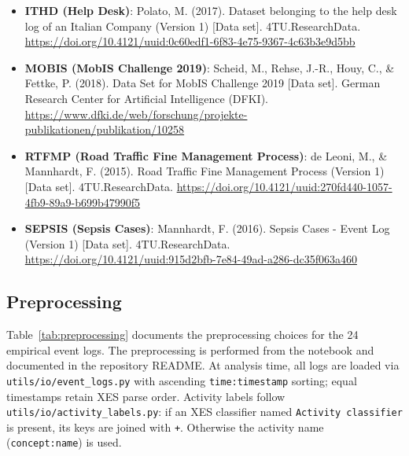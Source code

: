 \documentclass[11pt,a4paper]{article}
\begin{document}
\begin{itemize}
\item \textbf{ITHD (Help Desk)}: Polato, M. (2017). Dataset belonging to the help desk log of an Italian Company (Version 1) [Data set]. 4TU.ResearchData. \url{https://doi.org/10.4121/uuid:0c60edf1-6f83-4e75-9367-4c63b3e9d5bb}
\item \textbf{MOBIS (MobIS Challenge 2019)}: Scheid, M., Rehse, J.-R., Houy, C., \& Fettke, P. (2018). Data Set for MobIS Challenge 2019 [Data set]. German Research Center for Artificial Intelligence (DFKI). \url{https://www.dfki.de/web/forschung/projekte-publikationen/publikation/10258}
\item \textbf{RTFMP (Road Traffic Fine Management Process)}: de Leoni, M., \& Mannhardt, F. (2015). Road Traffic Fine Management Process (Version 1) [Data set]. 4TU.ResearchData. \url{https://doi.org/10.4121/uuid:270fd440-1057-4fb9-89a9-b699b47990f5}
\item \textbf{SEPSIS (Sepsis Cases)}: Mannhardt, F. (2016). Sepsis Cases - Event Log (Version 1) [Data set]. 4TU.ResearchData. \url{https://doi.org/10.4121/uuid:915d2bfb-7e84-49ad-a286-dc35f063a460}
\end{itemize}

\subsection{Preprocessing}
\label{sec:preprocessing-details}

Table~\ref{tab:preprocessing} documents the preprocessing choices for the 24 empirical event logs.
The preprocessing is performed from the notebook  and documented in the repository README.
At analysis time, all logs are loaded via \texttt{utils/io/event\_logs.py}
with ascending \texttt{time:timestamp} sorting; equal timestamps retain XES
parse order.
Activity labels follow \texttt{utils/io/activity\_labels.py}: if an XES
classifier named \texttt{Activity classifier} is present, its keys are joined
with \texttt{+}. Otherwise the activity name (\texttt{concept:name}) is used.
\end{document}
